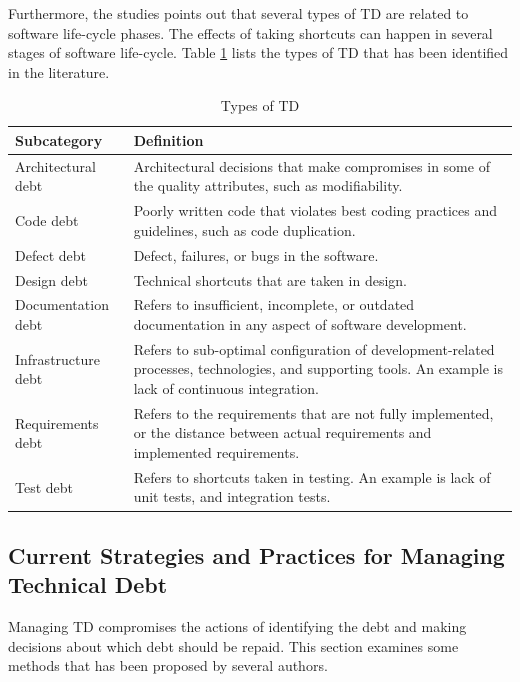 Furthermore, the studies points out that several types of TD are related to software life-cycle phases. The effects of taking shortcuts can happen in several stages of software life-cycle. Table \ref{tab:subcategories} lists the types of TD that has been identified in the literature.

\begin{table}
	\centering
	\begin{tabular}{ | p{5cm} | p{8cm} |}
	\hline
	\textbf{Subcategory} & \textbf{Definition} \\ \hline
	Architectural debt\cite{li2015systematic,p8-codabux,foser076-brown} & Architectural decisions that make compromises in some of the quality attributes, such as modifiability. \\ \hline
	Code debt\cite{li2015systematic,foser076-brown,tom2013exploration} & Poorly written code that violates best coding practices and guidelines, such as code duplication. \\ \hline
	Defect debt\cite{li2015systematic,tom2013exploration} & Defect, failures, or bugs in the software. \\ \hline
	Design debt\cite{li2015systematic,Zazworka:2011:PDD:1985362.1985372,foser076-brown} & Technical shortcuts that are taken in design.\\ \hline
	Documentation debt\cite{li2015systematic,foser076-brown,Zazworka:2013:CSE:2460999.2461005} & Refers to insufficient, incomplete, or outdated documentation in any aspect of software development.\\ \hline
	Infrastructure debt\cite{li2015systematic,tom2013exploration,p8-codabux} & Refers to sub-optimal configuration of development-related processes, technologies, and supporting tools. An example is lack of continuous integration.\\ \hline
	Requirements debt\cite{li2015systematic,Zazworka:2013:CSE:2460999.2461005} & Refers to the requirements that are not fully implemented, or the distance between actual requirements and implemented requirements.\\ \hline
	Test debt\cite{li2015systematic,Zazworka:2013:CSE:2460999.2461005,foser076-brown} & Refers to shortcuts taken in testing. An example is lack of unit tests, and integration tests.\\
	\hline
	\end{tabular}
	\caption{Types of TD} \label{tab:subcategories}
\end{table}

\subsection{Current Strategies and Practices for Managing Technical Debt}
Managing TD compromises the actions of identifying the debt and making decisions about which debt should be repaid\cite{foser076-brown,krutchen,url-mcconnell}. This section examines some methods that has been proposed by several authors.


